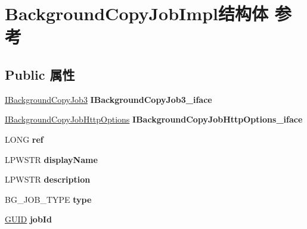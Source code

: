 \hypertarget{struct_background_copy_job_impl}{}\section{Background\+Copy\+Job\+Impl结构体 参考}
\label{struct_background_copy_job_impl}
\subsection*{Public 属性}
\begin{DoxyCompactItemize}
\item 
\mbox{\label{struct_background_copy_job_impl_a893f0e125d980ec11a8faa6ec12030be}} 
\hyperlink{interface_i_background_copy_job3}{I\+Background\+Copy\+Job3} {\bfseries I\+Background\+Copy\+Job3\+\_\+iface}
\item 
\mbox{\label{struct_background_copy_job_impl_a1a8bbba7b57def36b7a04849e3a75e2a}} 
\hyperlink{interface_i_background_copy_job_http_options}{I\+Background\+Copy\+Job\+Http\+Options} {\bfseries I\+Background\+Copy\+Job\+Http\+Options\+\_\+iface}
\item 
\mbox{\label{struct_background_copy_job_impl_a136c5138306e7f7933e5800b1c42792b}} 
L\+O\+NG {\bfseries ref}
\item 
\mbox{\label{struct_background_copy_job_impl_a83914246c630b8ce2f91048440114b4b}} 
L\+P\+W\+S\+TR {\bfseries display\+Name}
\item 
\mbox{\label{struct_background_copy_job_impl_ad38fbed0940bfce6d6b1c08511603f17}} 
L\+P\+W\+S\+TR {\bfseries description}
\item 
\mbox{\label{struct_background_copy_job_impl_aef90a3814229b0a5d813d517bb2b8552}} 
B\+G\+\_\+\+J\+O\+B\+\_\+\+T\+Y\+PE {\bfseries type}
\item 
\mbox{\label{struct_background_copy_job_impl_a9c12b39f78f8de206b0f85a44757eef0}} 
\hyperlink{interface_g_u_i_d}{G\+U\+ID} {\bfseries job\+Id}
\item 

\end{DoxyCompactItemize}

